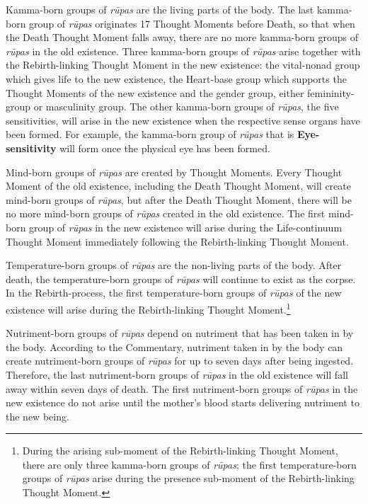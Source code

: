 Kamma-born groups of \textit{rūpas} are the living parts of the body. The last kamma-born group of \textit{rūpas} originates 17 Thought Moments before Death, so that when the Death Thought Moment falls away, there are no more kamma-born groups of \textit{rūpas} in the old existence. Three kamma-born groups of \textit{rūpas} arise together with the Rebirth-linking Thought Moment in the new existence: the vital-nonad group which gives life to the new existence, the Heart-base group which supports the Thought Moments of the new existence and the gender group, either femininity-group or masculinity group. The other kamma-born groups of \textit{rūpas}, the five sensitivities, will arise in the new existence when the respective sense organs have been formed. For example, the kamma-born group of \textit{rūpas} that is \textbf{Eye-sensitivity} will form once the physical eye has been formed.

Mind-born groups of \textit{rūpas} are created by Thought Moments. Every Thought Moment of the old existence, including the Death Thought Moment, will create mind-born groups of \textit{rūpas}, but after the Death Thought Moment, there will be no more mind-born groups of \textit{rūpas} created in the old existence. The first mind-born group of \textit{rūpas} in the new existence will arise during the Life-continuum Thought Moment immediately following the Rebirth-linking Thought Moment.

Temperature-born groups of \textit{rūpas} are the non-living parts of the body. After death, the temperature-born groups of \textit{rūpas} will continue to exist as the corpse. In the Rebirth-process, the first temperature-born groups of \textit{rūpas} of the new existence will arise during the Rebirth-linking Thought Moment.\footnote{During the arising sub-moment of the Rebirth-linking Thought Moment, there are only three kamma-born groups of \textit{rūpas}; the first temperature-born groups of \textit{rūpas} arise during the presence sub-moment of the Rebirth-linking Thought Moment.}

Nutriment-born groups of \textit{rūpas} depend on nutriment that has been taken in by the body. According to the Commentary, nutriment taken in by the body can create nutriment-born groups of \textit{rūpas} for up to seven days after being ingested. Therefore, the last nutriment-born groups of \textit{rūpas} in the old existence will fall away within seven days of death. The first nutriment-born groups of \textit{rūpas} in the new existence do not arise until the mother’s blood starts delivering nutriment to the new being.

